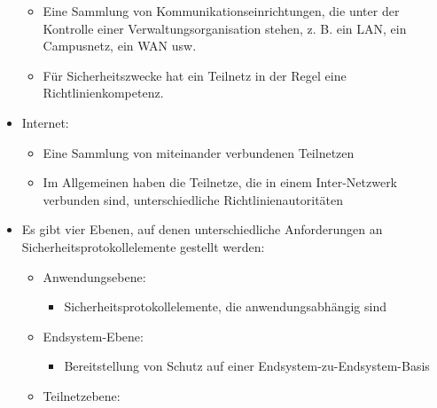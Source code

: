 \documentclass[a4paper]{article}
\begin{document}
\begin{multicols}{3}
\begin{itemize}
              \begin{itemize}
                  \item
                        Eine Sammlung von Kommunikationseinrichtungen, die unter der
                        Kontrolle einer Verwaltungsorganisation stehen, z. B. ein LAN, ein
                        Campusnetz, ein WAN usw.
                  \item
                        Für Sicherheitszwecke hat ein Teilnetz in der Regel eine
                        Richtlinienkompetenz.
              \end{itemize}
        \item
              Internet:

              \begin{itemize}
                  \item
                        Eine Sammlung von miteinander verbundenen Teilnetzen
                  \item
                        Im Allgemeinen haben die Teilnetze, die in einem Inter-Netzwerk
                        verbunden sind, unterschiedliche Richtlinienautoritäten
              \end{itemize}
        \item
              Es gibt vier Ebenen, auf denen unterschiedliche Anforderungen an
              Sicherheitsprotokollelemente gestellt werden:

              \begin{itemize}
                  \item
                        Anwendungsebene:

                        \begin{itemize}
                            \item
                                  Sicherheitsprotokollelemente, die anwendungsabhängig sind
                        \end{itemize}
                  \item
                        Endsystem-Ebene:

                        \begin{itemize}
                            \item
                                  Bereitstellung von Schutz auf einer Endsystem-zu-Endsystem-Basis
                        \end{itemize}
                  \item
                        Teilnetzebene:


\end{itemize}
\end{itemize}
\end{multicols}
\end{document}
